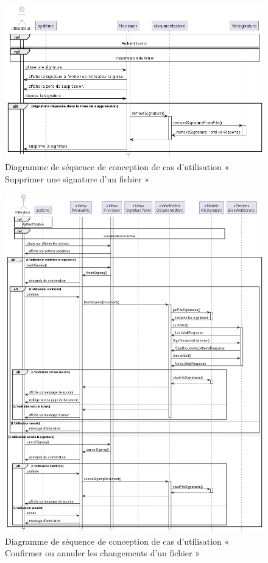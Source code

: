 \begin{figure}[H]
  \centering
  \includegraphics[width=1\textwidth]{out/diagrams/sprint4/sequence_delete_signature/sequence_delete_signature}
  \caption{Diagramme de séquence de conception de cas d'utilisation « Supprimer une signature d'un fichier »}
  \label{fig:sequence_conception_delete_signature_from_foile}
\end{figure}

\begin{figure}[H]
  \centering
  \includegraphics[width=1\textwidth]{out/diagrams/sprint4/sequence_save_cancel_siganture/sequence_save_cancel_siganture}
  \caption{Diagramme de séquence de conception de cas d'utilisation « Confirmer ou annuler les changements d'un fichier »}
  \label{fig:sequence_conception_save_cancel_siganture}
\end{figure}



